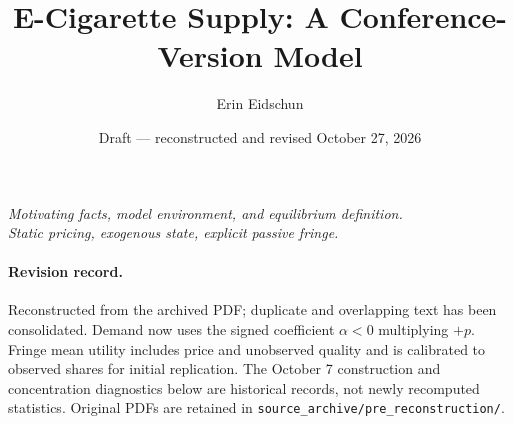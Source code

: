 \documentclass[11pt]{article}
\title{E-Cigarette Supply: A Conference-Version Model}
\author{Erin Eidschun}
\date{Draft --- reconstructed and revised October 27, 2026}
\begin{document}
\maketitle
\begin{center}\textit{Motivating facts, model environment, and equilibrium definition.\\Static pricing, exogenous state, explicit passive fringe.}\end{center}
\paragraph{Revision record.} Reconstructed from the archived PDF; duplicate and overlapping text has been consolidated. Demand now uses the signed coefficient $\alpha<0$ multiplying $+p$. Fringe mean utility includes price and unobserved quality and is calibrated to observed shares for initial replication. The October 7 construction and concentration diagnostics below are historical records, not newly recomputed statistics. Original PDFs are retained in \texttt{source\_archive/pre\_reconstruction/}.
\end{document}
